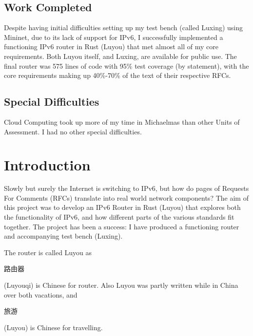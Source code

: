 \documentclass[12pt,a4paper,twoside,openany]{report}
\begin{document}
\section*{Work Completed}

Despite having initial difficulties setting up my test bench (called Luxing) using Mininet\cite{mininet}, due to its lack of support for IPv6, I successfully implemented a functioning IPv6 router in Rust (Luyou) that met almost all of my core requirements. Both Luyou itself, and Luxing, are available for public use\cite{repo}.  The final router was 575 lines of code with 95\% test coverage (by statement), with the core requirements making up 40\%-70\% of the text of their respective RFCs.

\section*{Special Difficulties}

Cloud Computing took up more of my time in Michaelmas than other Units of Assessment. I had no other special difficulties.

\tableofcontents
{}
\listoffigures
{}


\pagestyle{headings}

\chapter{Introduction}
\label{chap::introduction}
Slowly but surely the Internet is switching to IPv6\cite{ipv6_rfc}, but how do pages of Requests For Comments (RFCs) translate into real world network components? The aim of this project was to develop an IPv6 Router in Rust (Luyou) that explores both the functionality of IPv6, and how different parts of the various standards fit together. The project has been a success: I have produced a functioning router and accompanying test bench (Luxing).

\bigskip

The router is called Luyou as \begin{CJK}{UTF8}{gbsn}路由器\end{CJK} (Luyouqi) is Chinese for router. Also Luyou was partly written while in China over both vacations, and \begin{CJK}{UTF8}{gbsn}旅游\end{CJK} (Luyou) is Chinese for travelling. 
\end{document}
